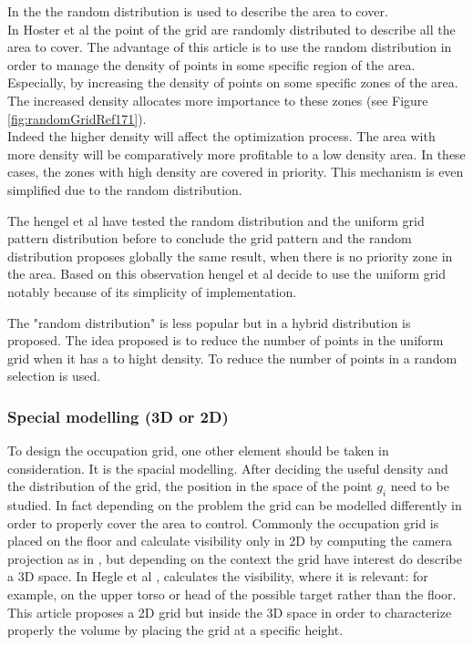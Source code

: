  In the  \cite{83*van2009,171*horster2006} the random distribution is used to describe the area to cover. \\
In Hoster et al \citep{171*horster2006} the point of the grid are randomly distributed to describe all the area to cover. The advantage of this article is to use the random distribution in order to manage the density of points in some specific region of the area. Especially, by increasing the density of points on some specific zones of the area. The increased density allocates more importance to these zones (see Figure \ref{fig:randomGridRef171}).\\
Indeed the higher density will affect the optimization process. The area with more density will be comparatively more profitable to a low density area. In these cases, the zones with high density are covered in priority. This mechanism is even simplified due to the random distribution.

The hengel et al \cite{83*van2009} have tested the random distribution and the uniform grid pattern distribution before to conclude the grid pattern and the random distribution proposes globally the same result, when there is no priority zone in the area. Based on this observation hengel et al \cite{83*van2009} decide to use the uniform grid notably because of its simplicity of implementation.

The "random distribution" is less popular but in \cite{22*zhao2008} a hybrid distribution is proposed. The idea proposed is to reduce the number of points in the uniform grid when it has a to hight density. To reduce the number of points in a random  selection is used. 



\subsubsection{Special modelling (3D  or 2D)}
To design the occupation grid, one other element should be taken in consideration. It is the spacial modelling. After deciding the useful density and the distribution of the grid, the position in the space of the point $g_i$ need to be studied.  
In fact depending on the problem the grid can be modelled differently in order to properly cover the area to control. Commonly the occupation grid is placed on the floor and calculate visibility only in 2D  by computing the  camera projection as in  \citep{164*valente2013,150*chakrabarty2002,8*zhou2011,170*yabuta2008,171*horster2006,22*zhao2008}, but depending on the context the grid have interest do describe a 3D space.  
In Hegle et al \cite{83*van2009}, calculates the visibility, where it is relevant: for example, on the upper torso or head of the possible target rather than the floor. This article  proposes a 2D grid but inside the 3D space in order to  characterize properly the volume by placing the grid at a specific height.  

